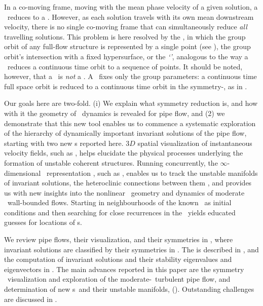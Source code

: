 \documentclass{jfm}
\begin{document}
In a co-moving frame, moving with the mean phase velocity of a given
solution, a \rpo\ reduces to a \po.
However, as each solution travels with its own mean downstream velocity,
there is no single co-moving frame that can simultaneously reduce
\emph{all} travelling solutions.
This problem is here resolved by the
{\mslices} \citep{rowley_reconstruction_2000,BeTh04,SiCvi10,FrCv11}, in
which the group orbit of any full-flow structure is represented by a
single point (see ), the group orbit's intersection
with a fixed hypersurface, or the \emph{`\slice'}, analogous to the way a
\PoincSec\ reduces a continuous time orbit to a sequence of points. It
should be noted, however, that a \slice\ is \emph{not} a \PoincSec. A
\slice\ fixes only the group parameters: a continuous time full space
orbit is reduced to a continuous time orbit in the symmetry-\reducedsp,
as in .

Our goals here are two-fold.
(i) We explain what symmetry reduction is, and how with it the geometry
of \statesp\ dynamics is revealed for pipe flow, and
(2) we demonstrate that this new tool enables us to commence a systematic
exploration of the hierarchy of dynamically important invariant solutions
of the pipe flow, starting with two new \rpo s reported here. $3D$
spatial visualization of instantaneous velocity fields,
such as , helps elucidate
the physical processes underlying the formation of unstable coherent
structures. Running concurrently, the $\infty$-dimensional \stateDsp\
representation \citep{GHCW07}, such as ,
enables us to track the unstable manifolds of invariant
solutions, the heteroclinic connections between them \citep{GHCV08}, and
{provides us with} new insights into the nonlinear \statesp\ geometry and
dynamics of moderate \Reynolds\ wall-bounded flows. Starting in
neighbourhoods of the known \reqva\
 as initial conditions and then searching for
close {recurrences} \citep{pchaot,CviGib10} in the \reducedsp\ yields
educated guesses for locations of \rpo s.

We review  pipe flows, their visualization,
and their symmetries in , where
invariant solutions are classified by their symmetries in
\refappe{appe:DiscSymmPipe}.
The {\mslices}  is described in \refsect{s:slice},
and the computation of invariant solutions and their stability
eigenvalues and eigenvectors in . The
main advances reported in this paper are the symmetry \reducedsp\
visualization and exploration of the moderate-\Reynolds\ turbulent pipe
flow, and determination of new \rpo s\ and their unstable manifolds,
(\refsect{s:rpos}). Outstanding challenges are discussed in
\refsect{s:concl}.
\end{document}
